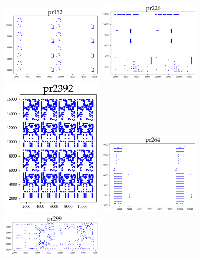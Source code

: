 \begin{appendices}
\begin{figure}[H]
\centering
\includegraphics[width=5cm]{../tsplib_euc2d_pictures_of_instances/pr152.png}
\includegraphics[width=5cm]{../tsplib_euc2d_pictures_of_instances/pr226.png}
\includegraphics[width=5cm]{../tsplib_euc2d_pictures_of_instances/pr2392.png}
\includegraphics[width=5cm]{../tsplib_euc2d_pictures_of_instances/pr264.png}
\includegraphics[width=5cm]{../tsplib_euc2d_pictures_of_instances/pr299.png}


\end{figure}
\end{appendices}
